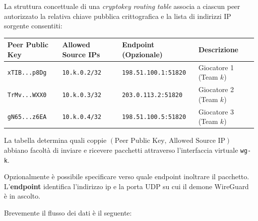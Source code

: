 \pagebreak

La struttura concettuale di una \emph{cryptokey routing table} associa a
ciascun peer autorizzato la relativa chiave pubblica crittografica e la
lista di indirizzi IP sorgente consentiti:

\begin{longtable}[]{@{}
  >{\raggedright\arraybackslash}p{}
  >{\raggedright\arraybackslash}p{}
  >{\raggedright\arraybackslash}p{}
  >{\raggedright\arraybackslash}p{}@{}}
\toprule\noalign{}
\begin{minipage}[b]{\linewidth}\raggedright
Peer Public Key
\end{minipage} & \begin{minipage}[b]{\linewidth}\raggedright
Allowed Source IPs
\end{minipage} & \begin{minipage}[b]{\linewidth}\raggedright
Endpoint (Opzionale)
\end{minipage} & \begin{minipage}[b]{\linewidth}\raggedright
Descrizione
\end{minipage} \\
\midrule\noalign{}
\endhead
\bottomrule\noalign{}
\endlastfoot
\passthrough{\lstinline!xTIB...p8Dg!} &
\passthrough{\lstinline!10.k.0.2/32!} &
\passthrough{\lstinline!198.51.100.1:51820!} & Giocatore 1 (Team
\(k\)) \\
\passthrough{\lstinline!TrMv...WXX0!} &
\passthrough{\lstinline!10.k.0.3/32!} &
\passthrough{\lstinline!203.0.113.2:51820!} & Giocatore 2 (Team
\(k\)) \\
\passthrough{\lstinline!gN65...z6EA!} &
\passthrough{\lstinline!10.k.0.4/32!} &
\passthrough{\lstinline!198.51.100.5:51820!} & Giocatore 3 (Team
\(k\)) \\
\end{longtable}

La tabella determina quali coppie
\((\text{Peer Public Key, Allowed Source IP})\) abbiano facoltà di
inviare e ricevere pacchetti attraverso l'interfaccia virtuale
\passthrough{\lstinline!wg-k!}.

Opzionalmente è possibile specificare verso quale endpoint inoltrare il
pacchetto. L'\textbf{endpoint} identifica l'indirizzo ip e la porta UDP
su cui il demone WireGuard è in ascolto.

Brevemente il flusso dei dati è il seguente:

